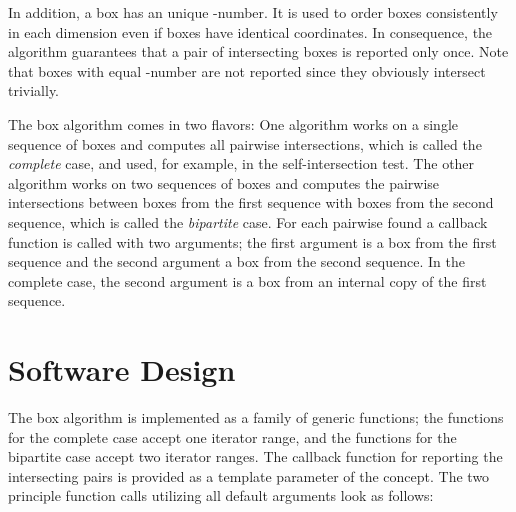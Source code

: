 In addition, a box has an unique -number. It is used to order
boxes consistently in each dimension even if boxes have identical
coordinates. In consequence, the algorithm guarantees that a pair of
intersecting boxes is reported only once. Note that boxes with equal
-number are not reported since they obviously intersect trivially.

The box  algorithm comes in two flavors: One algorithm
works on a single sequence of boxes and computes all pairwise
intersections, which is called the \emph{complete\/} case, and used,
for example, in the self-intersection test. The other algorithm works
on two sequences of boxes and computes the pairwise intersections
between boxes from the first sequence with boxes from the second
sequence, which is called the \emph{bipartite\/} case. For each
pairwise  found a callback function is called with two
arguments; the first argument is a box from the first sequence and the
second argument a box from the second sequence. In the complete case,
the second argument is a box from an internal copy of the first
sequence.


\section{Software Design}

The box  algorithm is implemented as a family of generic
functions; the functions for the complete case accept one iterator
range, and the functions for the bipartite case accept two iterator
ranges. The callback function for reporting the intersecting pairs is
provided as a template parameter of the  concept.
The two principle function calls utilizing all default arguments look
as follows:





